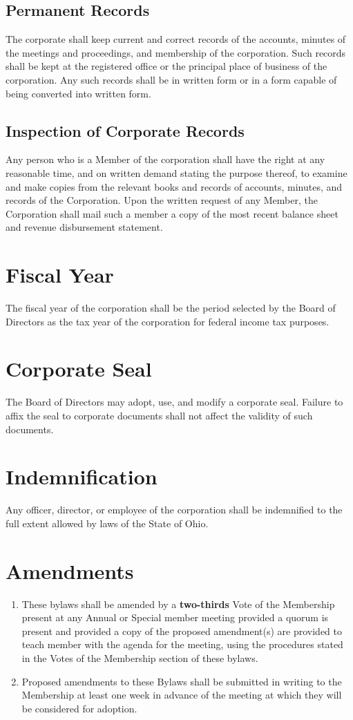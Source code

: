 \documentclass{article}
\begin{document}
\subsection{Permanent Records}
The corporate shall keep current and correct records of the accounts, minutes of the 
meetings and proceedings, and membership of the corporation.  Such records shall be kept 
at the registered office or the principal place of business of the corporation.  Any such 
records shall be in written form or in a form capable of being converted into written form.
\subsection{Inspection of Corporate Records}
Any person who is a Member of the corporation shall have the right at any reasonable time, 
and on written demand stating the purpose thereof, to examine and make copies from the 
relevant books and records of accounts, minutes, and records of the Corporation.  Upon 
the written request of any Member, the Corporation shall mail such a member a copy of the 
most recent balance sheet and revenue disbursement statement.
\section{Fiscal Year}
The fiscal year of the corporation shall be the period selected by the Board of Directors as 
the tax year of the corporation for federal income tax purposes.
\section{Corporate Seal}
The Board of Directors may adopt, use, and modify a corporate seal.  Failure to affix the 
seal to corporate documents shall not affect the validity of such documents.
\section{Indemnification}
Any officer, director, or employee of the corporation shall be indemnified to the full extent 
allowed by laws of the State of Ohio.
\section{Amendments}
\begin{enumerate}
\item These bylaws shall be amended by a \textbf{two-thirds} Vote of the Membership present at 
any Annual or Special member meeting provided a quorum is present and provided a copy 
of the proposed amendment(s) are provided to teach member with the agenda for the 
meeting, using the procedures stated in the Votes of the Membership section of these 
bylaws.
\item Proposed amendments to these Bylaws shall be submitted in writing to the 
Membership at least one week in advance of the meeting at which they will be considered 
for adoption.
\end{enumerate}
\end{document}
